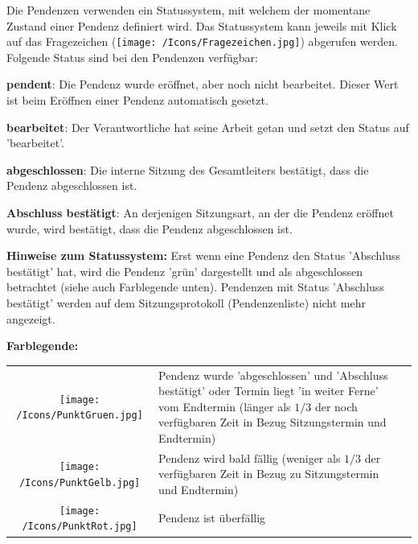 \vspace{\baselineskip}

Die Pendenzen verwenden ein Statussystem, mit welchem der momentane Zustand einer Pendenz definiert wird. Das Statussystem kann jeweils mit Klick auf das Fragezeichen (\texttt{[image: /Icons/Fragezeichen.jpg]})  abgerufen werden. Folgende Status sind bei den Pendenzen verfügbar:

\clearpage
\vspace{\baselineskip}

\begin{compactitem}
	\item \textbf{pendent}: Die Pendenz wurde eröffnet, aber noch nicht bearbeitet. Dieser Wert ist beim Eröffnen einer Pendenz automatisch gesetzt.
	\item \textbf{bearbeitet}: Der Verantwortliche hat seine Arbeit getan und setzt den Status auf 'bearbeitet'.
	\item \textbf{abgeschlossen}: Die interne Sitzung des Gesamtleiters bestätigt, dass die Pendenz abgeschlossen ist.
	\item \textbf{Abschluss bestätigt}: An derjenigen Sitzungsart, an der die Pendenz eröffnet wurde, wird bestätigt, dass die Pendenz
abgeschlossen ist.
\end{compactitem}

\vspace{\baselineskip}

\textbf{Hinweise zum Statussystem:} Erst wenn eine Pendenz den Status 'Abschluss bestätigt' hat, wird die Pendenz 'grün' dargestellt und als abgeschlossen betrachtet (siehe auch Farblegende unten). Pendenzen mit Status 'Abschluss bestätigt' werden auf dem Sitzungsprotokoll (Pendenzenliste) nicht mehr angezeigt.

\vspace{\baselineskip}

\textbf{Farblegende:}

\begin{tabular}{c p{14cm} l} %
\texttt{[image: /Icons/PunktGruen.jpg]} & Pendenz wurde 'abgeschlossen' und 'Abschluss bestätigt' oder Termin liegt 'in weiter Ferne' vom Endtermin (länger als \(1/3\) der noch verfügbaren Zeit in Bezug Sitzungstermin und Endtermin)\\
\texttt{[image: /Icons/PunktGelb.jpg]} & Pendenz wird bald fällig (weniger als \(1/3\) der verfügbaren Zeit in Bezug zu Sitzungstermin und Endtermin)\\
\texttt{[image: /Icons/PunktRot.jpg]} & Pendenz ist überfällig \\
\end{tabular}

